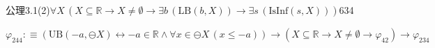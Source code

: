 \begin{fullproof}{公理3.1(2)}{$\forall X\,(X \subseteq \mathbb{R} \to X \neq \emptyset \to \exists b\,(\mathrm{LB}(b,X)) \to \exists s\,(\mathrm{IsInf}(s,X)))$}{634}
\begin{abbrevlist}
\item $\varphi_{244} :\equiv (\mathrm{UB}(-a,\ominus X) \leftrightarrow -a \in \mathbb{R} \land \forall x \in \ominus X\,(x \leq -a)) \to (X \subseteq \mathbb{R} \to X \neq \emptyset \to \varphi_{42}) \to \varphi_{234}$
\end{abbrevlist}
\end{fullproof}
